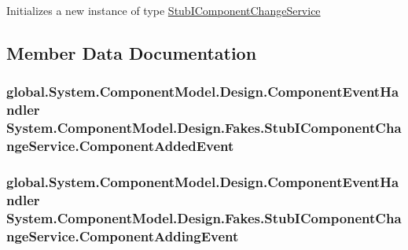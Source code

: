 Initializes a new instance of type \hyperlink{class_system_1_1_component_model_1_1_design_1_1_fakes_1_1_stub_i_component_change_service}{Stub\-I\-Component\-Change\-Service}



\subsection{Member Data Documentation}
\hypertarget{class_system_1_1_component_model_1_1_design_1_1_fakes_1_1_stub_i_component_change_service_a720ebffe2805addc7e33b1748a4832e4}{
\subsubsection[{Component\-Added\-Event}]{\setlength{\rightskip}{0pt plus 5cm}global.\-System.\-Component\-Model.\-Design.\-Component\-Event\-Handler System.\-Component\-Model.\-Design.\-Fakes.\-Stub\-I\-Component\-Change\-Service.\-Component\-Added\-Event}}\label{class_system_1_1_component_model_1_1_design_1_1_fakes_1_1_stub_i_component_change_service_a720ebffe2805addc7e33b1748a4832e4}
\hypertarget{class_system_1_1_component_model_1_1_design_1_1_fakes_1_1_stub_i_component_change_service_a60f00e8c76fb25e47019489627f8705b}{
\subsubsection[{Component\-Adding\-Event}]{\setlength{\rightskip}{0pt plus 5cm}global.\-System.\-Component\-Model.\-Design.\-Component\-Event\-Handler System.\-Component\-Model.\-Design.\-Fakes.\-Stub\-I\-Component\-Change\-Service.\-Component\-Adding\-Event}}\label{class_system_1_1_component_model_1_1_design_1_1_fakes_1_1_stub_i_component_change_service_a60f00e8c76fb25e47019489627f8705b}
